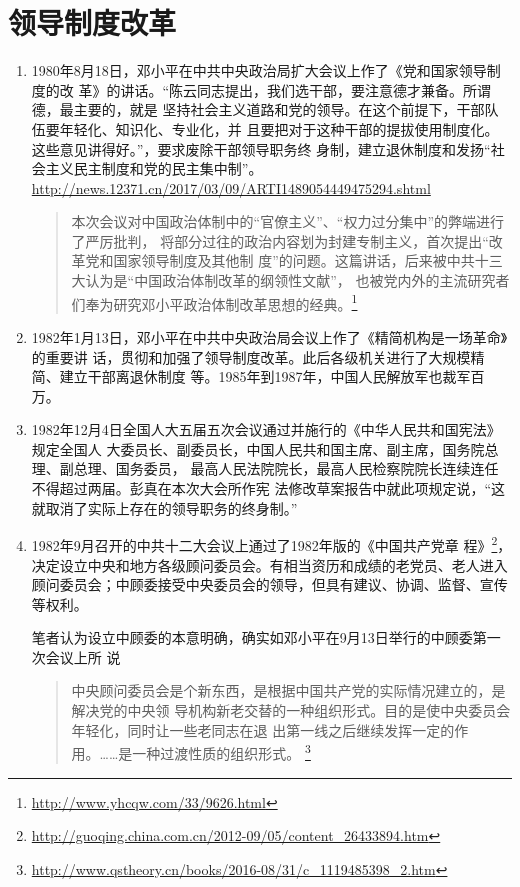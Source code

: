 \section{领导制度改革}

\begin{enumerate}

\item 1980年8月18日，邓小平在中共中央政治局扩大会议上作了《党和国家领导制度的改
  革》的讲话。“陈云同志提出，我们选干部，要注意德才兼备。所谓德，最主要的，就是
  坚持社会主义道路和党的领导。在这个前提下，干部队伍要年轻化、知识化、专业化，并
  且要把对于这种干部的提拔使用制度化。这些意见讲得好。”，要求废除干部领导职务终
  身制，建立退休制度和发扬“社会主义民主制度和党的民主集中制”。
  \url{http://news.12371.cn/2017/03/09/ARTI1489054449475294.shtml}
  \begin{quotation}
    本次会议对中国政治体制中的“官僚主义”、“权力过分集中”的弊端进行了严厉批判，
    将部分过往的政治内容划为封建专制主义，首次提出“改革党和国家领导制度及其他制
    度”的问题。这篇讲话，后来被中共十三大认为是“中国政治体制改革的纲领性文献”，
    也被党内外的主流研究者们奉为研究邓小平政治体制改革思想的经典。\footnote{\url{http://www.yhcqw.com/33/9626.html}}
  \end{quotation}

\item 1982年1月13日，邓小平在中共中央政治局会议上作了《精简机构是一场革命》的重要讲
  话，贯彻和加强了领导制度改革。此后各级机关进行了大规模精简、建立干部离退休制度
  等。1985年到1987年，中国人民解放军也裁军百万。

\item 1982年12月4日全国人大五届五次会议通过并施行的《中华人民共和国宪法》规定全国人
  大委员长、副委员长，中国人民共和国主席、副主席，国务院总理、副总理、国务委员，
  最高人民法院院长，最高人民检察院院长连续连任不得超过两届。彭真在本次大会所作宪
  法修改草案报告中就此项规定说，“这就取消了实际上存在的领导职务的终身制。”


\item 1982年9月召开的中共十二大会议上通过了1982年版的《中国共产党章
  程》\footnote{\url{http://guoqing.china.com.cn/2012-09/05/content_26433894.htm}}，决定设立中央和地方各级顾问委员会。有相当资历和成绩的老党员、老人进入顾问委员会；中顾委接受中央委员会的领导，但具有建议、协调、监督、宣传等权利。

  笔者认为设立中顾委的本意明确，确实如邓小平在9月13日举行的中顾委第一次会议上所
  说
  \begin{quotation}
    中央顾问委员会是个新东西，是根据中国共产党的实际情况建立的，是解决党的中央领
    导机构新老交替的一种组织形式。目的是使中央委员会年轻化，同时让一些老同志在退
    出第一线之后继续发挥一定的作用。……是一种过渡性质的组织形式。
    \footnote{\url{http://www.qstheory.cn/books/2016-08/31/c_1119485398_2.htm}}
  \end{quotation}


\end{enumerate}
